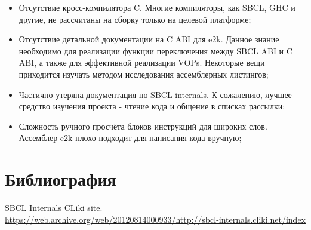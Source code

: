 \begin{itemize}
\item Отсутствие кросс-компилятора C. Многие компиляторы, как SBCL, GHC
и другие, не рассчитаны на сборку только на целевой платформе;
\item Отсутствие детальной документации на C ABI для e2k. Данное знание
необходимо для реализации функции переключения между SBCL ABI и C ABI,
а также для эффективной реализации VOPs. Некоторые вещи приходится
изучать методом исследования ассемблерных листингов;
\item Частично утеряна документация по SBCL internals. К сожалению,
лучшее средство изучения проекта - чтение кода и общение в списках
рассылки;
\item Сложность ручного просчёта блоков инструкций для широких слов.
Ассемблер e2k плохо подходит для написания кода вручную;
\end{itemize}


\section{Библиография}

\begin{thebibliography}{9}
 SBCL Internals CLiki site.
\url{https://web.archive.org/web/20120814000933/http://sbcl-internals.cliki.net/index}
\end{thebibliography}



